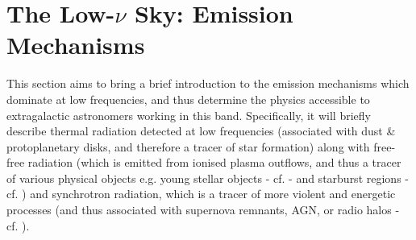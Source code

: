 
\section{The Low-$\nu$ Sky: Emission Mechanisms}
\pg
This section aims to bring a brief introduction to the emission mechanisms which dominate at low frequencies, and thus determine the physics accessible to extragalactic astronomers working in this band. Specifically, it will briefly describe thermal radiation detected at low frequencies (associated with dust \& protoplanetary disks, and therefore a tracer of star formation) along with free-free radiation (which is emitted from ionised plasma outflows, and thus a tracer of various physical objects e.g. young stellar objects - cf. \citet{2017ApJ...834..206C} - and starburst regions - cf. \citet{2015A&A...574A.114V}) and synchrotron radiation, which is a tracer of more violent and energetic processes (and thus associated with supernova remnants, AGN, or radio halos - cf. \citet{2010A&A...509A..68C}).

